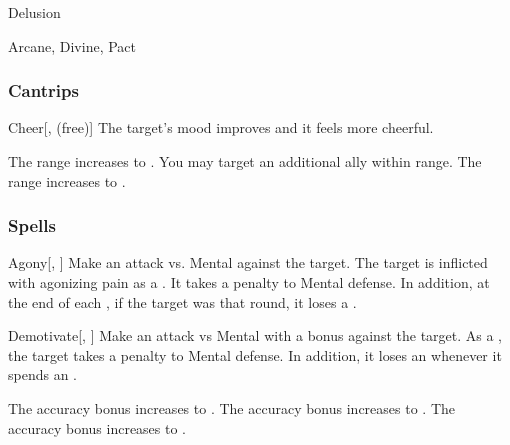 \newpage
\begin{spellsection}{Delusion}

\begin{spellheader}
\end{spellheader}


 Arcane, Divine, Pact

\subsubsection{Cantrips}


\begin{freeability}{Cheer}[,  (free)]
The target's mood improves and it feels more cheerful.

\rankline
{} The range increases to \rngmed.
 You may target an additional ally within range.
 The range increases to \rnglong.
\end{freeability}

\end{spellsection}


\subsubsection{Spells}


\lowercase{\hypertarget{spell:Agony}{}}\label{spell:Agony}
\begin{freeability}[Rank 1]{\hypertarget{spell:Agony}{Agony}}[, ]
Make an attack vs. Mental against the target.
\hit The target is inflicted with agonizing pain as a .
It takes a  penalty to Mental defense.
In addition, at the end of each , if the target was  that round, it loses a .
\end{freeability}
\vspace{0.25em}



\lowercase{\hypertarget{spell:Demotivate}{}}\label{spell:Demotivate}
\begin{freeability}[Rank 1]{\hypertarget{spell:Demotivate}{Demotivate}}[, ]
Make an attack vs Mental with a  bonus against the target.
\hit As a , the target takes a  penalty to Mental defense.
In addition, it loses an  whenever it spends an .

\rankline
{} The accuracy bonus increases to .
 The accuracy bonus increases to .
 The accuracy bonus increases to .
\end{freeability}
\vspace{0.25em}



